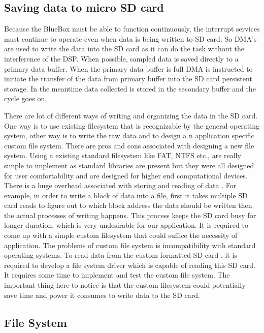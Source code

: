 \subsection{Saving data to micro SD card}

Because the BlueBox must be able to function continuously, the interrupt services must continue to operate even when data is being written to SD card. So DMA's are used to write the data into the SD card as it can do the task without the interference of the DSP. When possible, sampled data is saved directly to a primary data buffer. When the primary data buffer is full DMA is instructed to initiate the transfer of the data from primary buffer into the SD card persistent storage. In the meantime data collected is stored in the secondary buffer and the cycle goes on. 

There are lot of different ways of writing and organizing the data in the SD card. One way is to use existing filesystem that is recognizable by the general operating system, other way is to write the raw data and to design a n application specific custom file system. There are pros and cons associated with designing a new file system. Using a existing standard filesystem like FAT, NTFS etc., are really simple to implement as standard libraries are present but they were all designed for user comfortability and are designed for higher end computational devices. There is a huge overhead associated with storing and reading of data . For example, in order to write a block of data into a file, first it takes multiple SD card reads to figure out to which block address the data should be written then the actual processes of writing happens. This process keeps the SD card busy for longer duration, which is very undesirable for our application. It is required to come up with a simple custom filesystem that could suffice the necessity of application. The problems of custom file system is incompatibility with standard operating systems. To read data from the custom formatted SD card , it is required to develop a file system driver which is capable of reading this SD card. It requires some time to implement and test the custom file system. The important thing here to notice is that the custom filesystem could potentially save time and power it consumes to write data to the SD card.


\subsection{File System}\label{filesystem}


